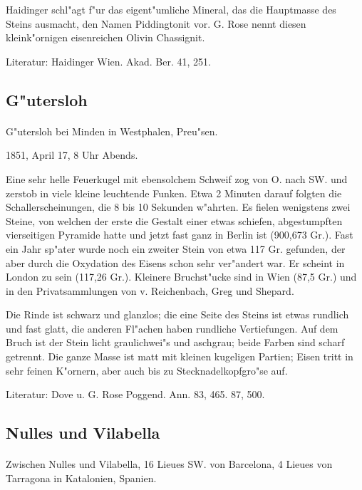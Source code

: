 \documentclass[a4paper, 11pt, oneside]{article}
\begin{document}
Haidinger schl"agt f"ur das eigent"umliche Mineral, das die Hauptmasse des Steins ausmacht, den Namen Piddingtonit vor. G. Rose nennt diesen kleink"ornigen eisenreichen Olivin Chassignit.

\footnotesize
Literatur: Haidinger Wien. Akad. Ber. 41, 251.

\subsection{G"utersloh}
\normalsize
\paragraph{}
G"utersloh bei Minden in Westphalen, Preu"sen.

1851, April 17, 8 Uhr Abends.

Eine sehr helle Feuerkugel mit ebensolchem Schweif zog von O. nach SW. und zerstob in viele kleine leuchtende Funken. Etwa 2 Minuten darauf folgten die Schallerscheinungen, die 8 bis 10 Sekunden w"ahrten. Es fielen wenigstens zwei Steine, von welchen der erste die Gestalt einer etwas schiefen, abgestumpften vierseitigen Pyramide hatte und jetzt fast ganz in Berlin ist (900,673 Gr.). Fast ein Jahr sp"ater wurde noch ein zweiter Stein von etwa 117 Gr. gefunden, der aber durch die Oxydation des Eisens schon sehr ver"andert war. Er scheint in London zu sein (117,26 Gr.). Kleinere Bruchst"ucke sind in Wien (87,5 Gr.) und in den Privatsammlungen von v. Reichenbach, Greg und Shepard.

Die Rinde ist schwarz und glanzlos; die eine Seite des Steins ist etwas rundlich und fast glatt, die anderen Fl"achen haben rundliche Vertiefungen. Auf dem Bruch ist der Stein licht graulichwei"s und aschgrau; beide Farben sind scharf getrennt. Die ganze Masse ist matt mit kleinen kugeligen Partien; Eisen tritt in sehr feinen K"ornern, aber auch bis zu Stecknadelkopfgro"se auf.

\footnotesize
Literatur: Dove u. G. Rose Poggend. Ann. 83, 465. 87, 500.

\subsection{Nulles und Vilabella}
\normalsize
\paragraph{}
Zwischen Nulles und Vilabella, 16 Lieues SW. von Barcelona, 4 Lieues von Tarragona in Katalonien, Spanien.
\end{document}
